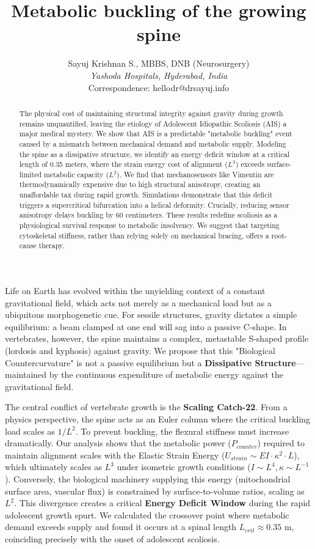 \documentclass[11pt]{article}
\title{Metabolic buckling of the growing spine}
\author{Sayuj Krishnan S., MBBS, DNB (Neurosurgery) \\
\textit{Yashoda Hospitals, Hyderabad, India} \\
Correspondence: hellodr@drsayuj.info}
\date{}
\begin{document}
\maketitle

\begin{abstract}
The physical cost of maintaining structural integrity against gravity during growth remains unquantified, leaving the etiology of Adolescent Idiopathic Scoliosis (AIS) a major medical mystery. We show that AIS is a predictable "metabolic buckling" event caused by a mismatch between mechanical demand and metabolic supply. Modeling the spine as a dissipative structure, we identify an energy deficit window at a critical length of 0.35 meters, where the strain energy cost of alignment ($L^3$) exceeds surface-limited metabolic capacity ($L^2$). We find that mechanosensors like Vimentin are thermodynamically expensive due to high structural anisotropy, creating an unaffordable tax during rapid growth. Simulations demonstrate that this deficit triggers a supercritical bifurcation into a helical deformity. Crucially, reducing sensor anisotropy delays buckling by 60 centimeters. These results redefine scoliosis as a physiological survival response to metabolic insolvency. We suggest that targeting cytoskeletal stiffness, rather than relying solely on mechanical bracing, offers a root-cause therapy.
\end{abstract}

Life on Earth has evolved within the unyielding context of a constant gravitational field, which acts not merely as a mechanical load but as a ubiquitous morphogenetic cue\cite{thompson1917growth}. For sessile structures, gravity dictates a simple equilibrium: a beam clamped at one end will sag into a passive C-shape. In vertebrates, however, the spine maintains a complex, metastable S-shaped profile (lordosis and kyphosis) against gravity\cite{latimer2005upright}. We propose that this "Biological Countercurvature" is not a passive equilibrium but a \textbf{Dissipative Structure}---maintained by the continuous expenditure of metabolic energy against the gravitational field.

The central conflict of vertebrate growth is the \textbf{Scaling Catch-22}. From a physics perspective, the spine acts as an Euler column where the critical buckling load scales as $1/L^2$. To prevent buckling, the flexural stiffness must increase dramatically. Our analysis shows that the metabolic power ($P_{counter}$) required to maintain alignment scales with the Elastic Strain Energy ($U_{strain} \sim EI \cdot \kappa^2 \cdot L$), which ultimately scales as $L^3$ under isometric growth conditions ($I \sim L^4, \kappa \sim L^{-1}$). Conversely, the biological machinery supplying this energy (mitochondrial surface area, vascular flux) is constrained by surface-to-volume ratios, scaling as $L^2$\cite{west1997general,rolfe1997cellular}. This divergence creates a critical \textbf{Energy Deficit Window} during the rapid adolescent growth spurt. We calculated the crossover point where metabolic demand exceeds supply and found it occurs at a spinal length $L_{crit} \approx 0.35$ m, coinciding precisely with the onset of adolescent scoliosis.
\end{document}
